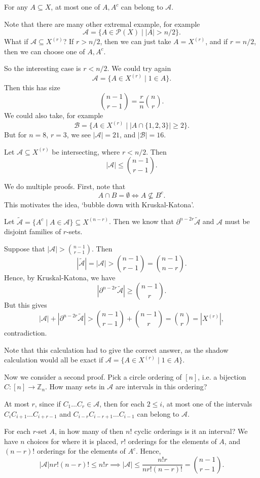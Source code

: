 \documentclass[12pt]{article}
\begin{document}
\begin{proofbox}
	For any $A \subseteq X$, at most one of $A, A^{c}$ can belong to $\mathcal{A}$.
\end{proofbox}

Note that there are many other extremal example, for example
\[
	\mathcal{A} = \{A \in \mathcal{P}(X) \mid |A| > n/2\}.
\]
What if $\mathcal{A} \subseteq X^{(r)}$? If $r > n/2$, then we can just take $A = X^{(r)}$, and if $r = n/2$, then we can choose one of $A, A^{c}$.

So the interesting case is $r < n/2$. We could try again
\[
	\mathcal{A} = \{A \in X^{(r)} \mid 1 \in A\}.
\]
Then this has size
\[
	\binom{n-1}{r-1} = \frac{r}{n} \binom nr.
\]
We could also take, for example
\[
	\mathcal{B} = \{A \in X^{(r)} \mid |A \cap \{1, 2, 3\}| \geq 2\}.
\]
But for $n = 8$, $r = 3$, we see $|\mathcal{A}| = 21$, and $|\mathcal{B}| = 16$.

\begin{theorem}
	Let $\mathcal{A} \subseteq X^{(r)}$ be intersecting, where $r < n/2$. Then
	\[
		|\mathcal{A}| \leq \binom{n-1}{r-1}.
	\]
\end{theorem}

\begin{proofbox}
	We do multiple proofs. First, note that
	\[
	A \cap B = \emptyset \iff A \not \subseteq B^{c}.
	\]
	This motivates the idea, `bubble down with Kruskal-Katona'.

	Let $\tilde{\mathcal{A}} = \{A^{c} \mid A \in \mathcal{A}\} \subseteq X^{(n - r)}$. Then we know that $\partial^{n - 2r} \tilde{\mathcal{A}}$ and $\mathcal{A}$ must be disjoint families of $r$-sets.

	Suppose that $|\mathcal{A}| > \binom{n-1}{r-1}$. Then
	\[
		|\tilde{\mathcal{A}}| = |\mathcal{A}| > \binom{n-1}{r-1} = \binom{n-1}{n-r}.
	\]
	Hence, by Kruskal-Katona, we have
	\[
		|\partial^{n-2r} \tilde{\mathcal{A}}| \geq \binom{n-1}{r}.
	\]
	But this gives
	\[
		|\mathcal{A}| + |\partial^{n-2r} \tilde{\mathcal{A}}| > \binom{n-1}{r-1} + \binom{n-1}{r} = \binom nr = |X^{(r)}|,
	\]
	contradiction.

	Note that this calculation had to give the correct answer, as the shadow calculation would all be exact if $\mathcal{A} = \{A \in X^{(r)} \mid 1 \in A\}$.

	Now we consider a second proof. Pick a circle ordering of $[n]$, i.e. a bijection $C : [n] \to \mathbb{Z}_n$. How many sets in $\mathcal{A}$ are intervals in this ordering?

	At most $r$, since if $C_1 \ldots C_r \in \mathcal{A}$, then for each $2 \leq i$, at most one of the intervals $C_i C_{i+1} \ldots C_{i+r-1}$ and $C_{i-r} C_{i-r+1} \ldots C_{i-1}$ can belong to $\mathcal{A}$.

	For each $r$-set $A$, in how many of then $n!$ cyclic orderings is it an interval? We have $n$ choices for where it is placed, $r!$ orderings for the elements of $A$, and $(n-r)!$ orderings for the elements of $A^{c}$. Hence,
	\[
		|\mathcal{A}| n r! (n-r)! \leq n! r \implies |\mathcal{A}| \leq \frac{n! r}{n r! (n - r)!} = \binom{n-1}{r-1}.
	\]
\end{proofbox}
\end{document}
